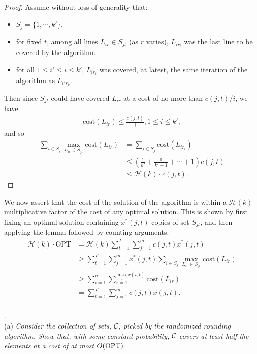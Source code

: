 \documentclass[a4paper,11pt]{article}
\begin{document}
\begin{proof}
    Assume without loss of generality that:
    \begin{itemize}[itemsep=0ex]
        \item
            $S_j = \{ 1, \cdots, k' \}$.
        \item
            for fixed $t$, among all lines $L_{ir} \in S_{jt}$ (as $r$ varies), $L_{ir_i}$ was the last line to be covered by the algorithm.
        \item
            for all $1 \leq i' \leq i \leq k'$, $L_{ir_i}$ was covered, at latest, the same iteration of the algorithm as $L_{i'r_{i'}}$.
    \end{itemize}
    Then since $S_{jt}$ could have covered $L_{ir}$ at a cost of no more than $c(j, t)/i$, we have
    \begin{align*}
        \text{cost}(L_{ir}) \leq \frac{c(j, t)}{i}, 1 \leq i \leq k',
    \end{align*}
    and so
    \begin{align*}
        \sum_{i \in S_j} \max_{L_{ir} \in S_{jt}} \text{cost}(L_{ir}) &= \sum_{i \in S_j} \text{cost}(L_{ir_i}) \\
        &\leq \left( \frac{1}{k'} + \frac{1}{k' - 1} + \cdots + 1 \right) c(j, t) \\
        &\leq \mathcal{H}(k) \cdot c(j, t).
    \end{align*}
\end{proof}
We now assert that the cost of the solution of the algorithm is within a $\mathcal{H}(k)$ multiplicative factor of the cost of any optimal solution. This is shown by first fixing an optimal solution containing $x^*(j, t)$ copies of set $S_{jt}$, and then applying the lemma followed by counting arguments:
\begin{align*}
    \mathcal{H}(k) \cdot \text{OPT} &= \mathcal{H}(k) \sum_{t = 1}^T \sum_{j = 1}^m c(j, t) x^*(j, t) \\
    &\geq \sum_{t = 1}^T \sum_{j = 1}^m x^*(j, t) \sum_{i \in S_j} \max_{L_{ir} \in S_{jt}} \text{cost}(L_{ir}) \\
    &\geq \sum_{i = 1}^n \sum_{r = 1}^{\max_t r(i, t)} \text{cost}(L_{ir}) \\
    &= \sum_{t = 1}^T \sum_{j = 1}^m c(j, t) x(j, t).
\end{align*} \\


.\\
(a) \emph{Consider the collection of sets, ${\cal C}$, picked by the randomized rounding algorithm.
Show that, with some constant probability, 
${\cal C}$ covers at least half the elements at a cost of at most $O( {\rm OPT })$.} \\
\end{document}
